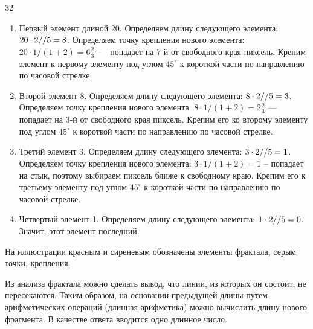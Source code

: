 \begin{myverbbox}[\small]{\voutput}
    32
\end{myverbbox}

\explanationSection
\begin{enumerate}
    \item Первый элемент длиной $20$. Определяем длину следующего элемента: \linebreak $20 \cdot 2\space // \space 5 = 8$. Определяем точку 
    крепления нового элемента: \newline $20 \cdot 1 / (1 + 2) = 6 \frac{2}{3}$~— попадает на 7-й от свободного края пиксель. Крепим элемент 
    к первому элементу под углом $45^{\circ}$ к короткой части по направлению по часовой стрелке. 
    \item Второй элемент $8$. Определяем длину следующего элемента: $8 \cdot 2 \space // \space 5 = 3$. Определяем точку крепления 
    нового элемента: $8 \cdot 1 / (1 + 2) = 2 \frac{2}{3}$  — попадает на 3-й от свободного края пиксель. Крепим его ко второму 
    элементу под углом $45^{\circ}$ к короткой части по направлению по часовой стрелке. 
    \item Третий элемент 3. Определяем длину следующего элемента: $3 \cdot 2 \space // \space 5 = 1$. Определяем точку крепления 
    нового элемента: $3 \cdot 1 / (1 + 2) = 1$  -- попадает на стык, поэтому выбираем пиксель ближе к свободному краю. 
    Крепим его к третьему элементу под углом $45^{\circ}$ к короткой части по направлению по часовой стрелке.
    \item Четвертый элемент 1. Определяем длину следующего элемента: $1 \cdot 2 \space // \space 5 = 0$. Значит, этот элемент последний.
\end{enumerate}

На иллюстрации красным и сиреневым обозначены элементы фрактала, серым точки, крепления.


\solutionSection
Из анализа фрактала можно сделать вывод, что линии, из которых он состоит, не пересекаются. Таким образом, на основании предыдущей длины путем арифметических операций (длинная арифметика) можно вычислить длину нового фрагмента. В качестве ответа вводится одно длинное число.

